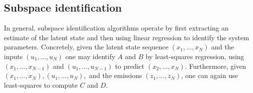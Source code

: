 \subsection{Subspace identification}
\label{sec:bestlds:theory:subspace}

In general, subspace identification algorithms operate by first extracting an estimate of the latent state and then using linear regression to identify the system parameters. Concretely, given the latent state sequence $(x_1, ..., x_N)$ and the inputs $(u_1, ..., u_N)$ one may identify $A$ and $B$ by least-squares regression, using $(x_1, ..., x_{N-1})$ and $(u_1, ..., u_{N-1})$ to predict $(x_2, ..., x_N)$. Furthermore, given $(x_1, ..., x_N), (u_1, ..., u_N),$ and the emissions $(z_1, ..., z_N)$, one can again use least-squares to compute $C$ and $D$.

